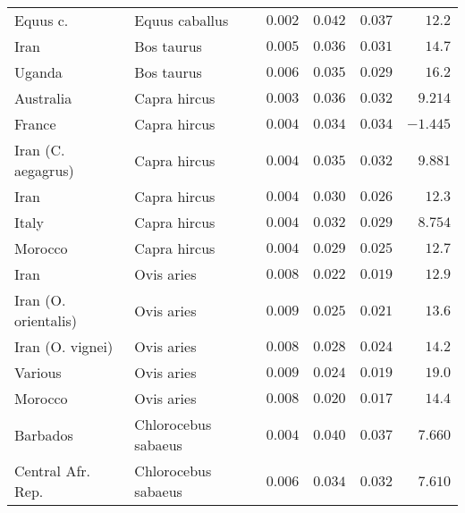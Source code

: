 \documentclass{article}
\begin{document}
\begin{center}
\begin{longtable}{|l|l|r|r|r|r|}
            \bottomrule
            \endlastfoot
            Equus c.             & Equus caballus      & $ 0.002$              & $ 0.042$ & $ 0.037$            & $  12.2$   \\
            Iran                 & Bos taurus          & $ 0.005$              & $ 0.036$ & $ 0.031$            & $  14.7$   \\
            Uganda               & Bos taurus          & $ 0.006$              & $ 0.035$ & $ 0.029$            & $  16.2$   \\
            Australia            & Capra hircus        & $ 0.003$              & $ 0.036$ & $ 0.032$            & $ 9.214$ \\
            France               & Capra hircus        & $ 0.004$              & $ 0.034$ & $ 0.034$            & $-1.445$ \\
            Iran (C. aegagrus)   & Capra hircus        & $ 0.004$              & $ 0.035$ & $ 0.032$            & $ 9.881$ \\
            Iran                 & Capra hircus        & $ 0.004$              & $ 0.030$ & $ 0.026$            & $  12.3$   \\
            Italy                & Capra hircus        & $ 0.004$              & $ 0.032$ & $ 0.029$            & $ 8.754$ \\
            Morocco              & Capra hircus        & $ 0.004$              & $ 0.029$ & $ 0.025$            & $  12.7$   \\
            Iran                 & Ovis aries          & $ 0.008$              & $ 0.022$ & $ 0.019$            & $  12.9$   \\
            Iran (O. orientalis) & Ovis aries          & $ 0.009$              & $ 0.025$ & $ 0.021$            & $  13.6$   \\
            Iran (O. vignei)     & Ovis aries          & $ 0.008$              & $ 0.028$ & $ 0.024$            & $  14.2$   \\
            Various              & Ovis aries          & $ 0.009$              & $ 0.024$ & $ 0.019$            & $  19.0$   \\
            Morocco              & Ovis aries          & $ 0.008$              & $ 0.020$ & $ 0.017$            & $  14.4$   \\
            Barbados             & Chlorocebus sabaeus & $ 0.004$              & $ 0.040$ & $ 0.037$            & $ 7.660$ \\
            Central Afr. Rep.    & Chlorocebus sabaeus & $ 0.006$              & $ 0.034$ & $ 0.032$            & $ 7.610$ \\

\end{longtable}
\end{center}
\end{document}
